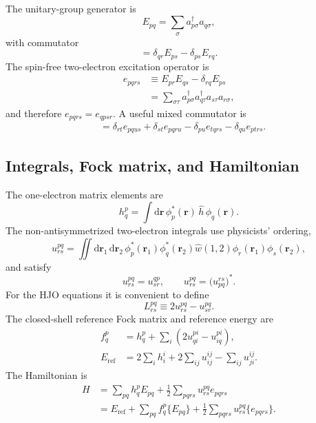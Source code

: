 \documentclass[10pt]{article}
\numberwithin{equation}{section}
\newcommand{\Eref}{E_{\mathrm{ref}}}
\begin{document}
The unitary-group generator is
\begin{equation}
 E_{pq}=\sum_{\sigma}a_{p\sigma}^{\dagger}a_{q\sigma},
\end{equation}
with commutator
\begin{equation}
 [E_{pq},E_{rs}]=\delta_{qr}E_{ps}-\delta_{ps}E_{rq}.
\end{equation}
The spin-free two-electron excitation operator is
\begin{align}
 e_{pqrs}
 &\equiv E_{pr}E_{qs}-\delta_{rq}E_{ps}
 \\
 &=\sum_{\sigma\tau}
   a_{p\sigma}^{\dagger}a_{q\tau}^{\dagger}
   a_{s\tau}a_{r\sigma},
\end{align}
and therefore $e_{pqrs}=e_{qpsr}$.  A useful mixed commutator is
\begin{align}
 [e_{pqrs},E_{tu}]
 &=\delta_{rt}e_{pqus}+\delta_{st}e_{pqru}
   -\delta_{pu}e_{tqrs}-\delta_{qu}e_{ptrs}.
\end{align}

\subsection{Integrals, Fock matrix, and Hamiltonian}

The one-electron matrix elements are
\begin{equation}
 h^{p}_{q}
 =\int\!\mathrm{d}\mathbf r\,
   \phi_p^{*}(\mathbf r)\,\hat h\,\phi_q(\mathbf r).
\end{equation}
The non-antisymmetrized two-electron integrals use physicists' ordering,
\begin{equation}
 u^{pq}_{rs}
 =\iint\!\mathrm{d}\mathbf r_1\,\mathrm{d}\mathbf r_2\,
   \phi_p^{*}(\mathbf r_1)\phi_q^{*}(\mathbf r_2)
   \hat w(1,2)
   \phi_r(\mathbf r_1)\phi_s(\mathbf r_2),
\end{equation}
and satisfy
\begin{equation}
 u^{pq}_{rs}=u^{qp}_{sr},
 \qquad
 u^{pq}_{rs}=\bigl(u^{rs}_{pq}\bigr)^{*}.
\end{equation}
For the HJO equations it is convenient to define
\begin{equation}
 L^{pq}_{rs}\equiv 2u^{pq}_{rs}-u^{pq}_{sr}.
\end{equation}
The closed-shell reference Fock matrix and reference energy are
\begin{align}
 f^{p}_{q}
 &=h^{p}_{q}+\sum_i\left(2u^{pi}_{qi}-u^{pi}_{iq}\right),
 \\
 \Eref
 &=2\sum_i h^{i}_{i}
   +2\sum_{ij}u^{ij}_{ij}
   -\sum_{ij}u^{ij}_{ji}.
\end{align}
The Hamiltonian is
\begin{align}
 H
 &=\sum_{pq}h^{p}_{q}E_{pq}
   +\frac12\sum_{pqrs}u^{pq}_{rs}e_{pqrs}
 \\
 &=\Eref
   +\sum_{pq}f^{p}_{q}\{E_{pq}\}
   +\frac12\sum_{pqrs}u^{pq}_{rs}\{e_{pqrs}\}.
\end{align}
\end{document}
